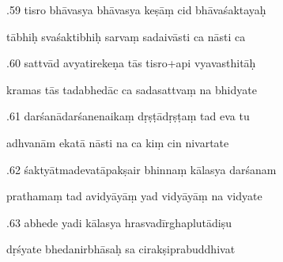 \documentclass[article,12pt,a4paper]{memoir}%
\newcounter{parCount}
\begin{document}
	  
	  \pstart {}.59 tisro bhāvasya bhāvasya keṣāṃ cid bhāvaśaktayaḥ 
	{}
	\pend%
      

	  
	  \pstart \leavevmode%
	tābhiḥ svaśaktibhiḥ sarvaṃ sadaivāsti ca nāsti ca 
	{}
	\pend%
      

	  
	  \pstart {}.60 sattvād avyatirekeṇa tās tisro+api vyavasthitāḥ 
	{}
	\pend%
      

	  
	  \pstart \leavevmode%
	kramas tās tadabhedāc ca sadasattvaṃ na bhidyate 
	{}
	\pend%
      

	  
	  \pstart {}.61 darśanādarśanenaikaṃ dṛṣṭādṛṣṭaṃ tad eva tu 
	{}
	\pend%
      

	  
	  \pstart \leavevmode%
	adhvanām ekatā nāsti na ca kiṃ cin nivartate 
	{}
	\pend%
      

	  
	  \pstart {}.62 śaktyātmadevatāpakṣair bhinnaṃ kālasya darśanam 
	{}
	\pend%
      

	  
	  \pstart \leavevmode%
	prathamaṃ tad avidyāyāṃ yad vidyāyāṃ na vidyate 
	{}
	\pend%
      

	  
	  \pstart {}.63 abhede yadi kālasya hrasvadīrghaplutādiṣu 
	{}
	\pend%
      

	  
	  \pstart \leavevmode%
	dṛśyate bhedanirbhāsaḥ sa cirakṣiprabuddhivat 
	{}
	\pend%
      
\end{document}
